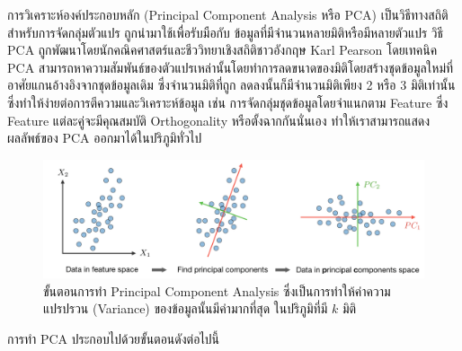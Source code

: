 การวิเคราะห์องค์ประกอบหลัก (Principal Component Analysis หรือ PCA) เป็นวิธีทางสถิติสำหรับการจัดกลุ่มตัวแปร ถูกนำมาใช้เพื่อรับมือกับ%
ข้อมูลที่มีจำนวนหลายมิติหรือมีหลายตัวแปร วิธี PCA ถูกพัฒนาโดยนักคณิคศาสตร์และชีววิทยาเชิงสถิติชาวอังกฤษ Karl Pearson โดยเทคนิค PCA 
สามารถหาความสัมพันธ์ของตัวแปรเหล่านั้นโดยทำการลดขนาดของมิติโดยสร้างชุดข้อมูลใหม่ที่อาศัยแกนอ้างอิงจากชุดข้อมูลเดิม ซึ่งจำนวนมิติที่ถูก%
ลดลงนั้นก็มีจำนวนมิติเพียง 2 หรือ 3 มิติเท่านั้น ซึ่งทำให้ง่ายต่อการตีความและวิเคราะห์ข้อมูล เช่น การจัดกลุ่มชุดข้อมูลโดยจำแนกตาม Feature 
ซึ่ง Feature แต่ละคู่จะมีคุณสมบัติ Orthogonality หรือตั้งฉากกันนั่นเอง ทำให้เราสามารถแสดงผลลัพธ์ของ PCA ออกมาได้ในปริภูมิทั่วไป

\begin{figure}[htbp]
    \centering
    \includegraphics[width=\linewidth]{fig/pca_process.png}
    \caption{ขั้นตอนการทำ Principal Component Analysis ซึ่งเป็นการทำให้ค่าความแปรปรวน (Variance) ของข้อมูลนั้นมีค่ามากที่สุด%
    ในปริภูมิที่มี $k$ มิติ}
    \label{fig:pca_process}
\end{figure}

การทำ PCA ประกอบไปด้วยขั้นตอนดังต่อไปนี้

